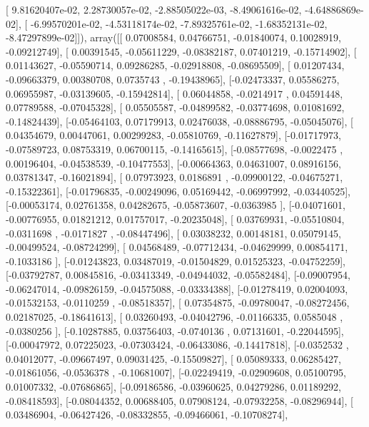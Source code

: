 \documentclass{article}
\begin{document}
       [  9.81620407e-02,   2.28730057e-02,  -2.88505022e-03,
         -8.49061616e-02,  -4.64886869e-02],
       [ -6.99570201e-02,  -4.53118174e-02,  -7.89325761e-02,
         -1.68352131e-02,  -8.47297899e-02]]), array([[ 0.07008584,  0.04766751, -0.01840074,  0.10028919, -0.09212749],
       [ 0.00391545, -0.05611229, -0.08382187,  0.07401219, -0.15714902],
       [ 0.01143627, -0.05590714,  0.09286285, -0.02918808, -0.08695509],
       [ 0.01207434, -0.09663379,  0.00380708,  0.0735743 , -0.19438965],
       [-0.02473337,  0.05586275,  0.06955987, -0.03139605, -0.15942814],
       [ 0.06044858, -0.0214917 ,  0.04591448,  0.07789588, -0.07045328],
       [ 0.05505587, -0.04899582, -0.03774698,  0.01081692, -0.14824439],
       [-0.05464103,  0.07179913,  0.02476038, -0.08886795, -0.05045076],
       [ 0.04354679,  0.00447061,  0.00299283, -0.05810769, -0.11627879],
       [-0.01717973, -0.07589723,  0.08753319,  0.06700115, -0.14165615],
       [-0.08577698, -0.0022475 ,  0.00196404, -0.04538539, -0.10477553],
       [-0.00664363,  0.04631007,  0.08916156,  0.03781347, -0.16021894],
       [ 0.07973923,  0.0186891 , -0.09900122, -0.04675271, -0.15322361],
       [-0.01796835, -0.00249096,  0.05169442, -0.06997992, -0.03440525],
       [-0.00053174,  0.02761358,  0.04282675, -0.05873607, -0.0363985 ],
       [-0.04071601, -0.00776955,  0.01821212,  0.01757017, -0.20235048],
       [ 0.03769931, -0.05510804, -0.0311698 , -0.0171827 , -0.08447496],
       [ 0.03038232,  0.00148181,  0.05079145, -0.00499524, -0.08724299],
       [ 0.04568489, -0.07712434, -0.04629999,  0.00854171, -0.1033186 ],
       [-0.01243823,  0.03487019, -0.01504829,  0.01525323, -0.04752259],
       [-0.03792787,  0.00845816, -0.03413349, -0.04944032, -0.05582484],
       [-0.09007954, -0.06247014, -0.09826159, -0.04575088, -0.03334388],
       [-0.01278419,  0.02004093, -0.01532153, -0.0110259 , -0.08518357],
       [ 0.07354875, -0.09780047, -0.08272456,  0.02187025, -0.18641613],
       [ 0.03260493, -0.04042796, -0.01166335,  0.0585048 , -0.0380256 ],
       [-0.10287885,  0.03756403, -0.0740136 ,  0.07131601, -0.22044595],
       [-0.00047972,  0.07225023, -0.07303424, -0.06433086, -0.14417818],
       [-0.0352532 ,  0.04012077, -0.09667497,  0.09031425, -0.15509827],
       [ 0.05089333,  0.06285427, -0.01861056, -0.0536378 , -0.10681007],
       [-0.02249419, -0.02909608,  0.05100795,  0.01007332, -0.07686865],
       [-0.09186586, -0.03960625,  0.04279286,  0.01189292, -0.08418593],
       [-0.08044352,  0.00688405,  0.07908124, -0.07932258, -0.08296944],
       [ 0.03486904, -0.06427426, -0.08332855, -0.09466061, -0.10708274],
\end{document}
